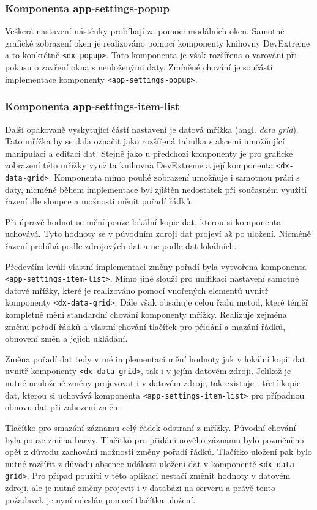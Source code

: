 \subsubsection*{Komponenta app-settings-popup}
Veškerá nastavení nástěnky probíhají za pomoci modálních oken. Samotné grafické zobrazení oken je realizováno pomocí komponenty knihovny DevExtreme a to konkrétně \texttt{<dx-popup>}. Tato komponenta je však rozšířena o varování při pokusu o zavření okna s neuloženými daty. Zmíněné chování je součástí implementace komponenty \texttt{<app-settings-popup>}.


\subsubsection*{Komponenta app-settings-item-list}
Další opakovaně vyskytující částí nastavení je datová mřížka (angl. \emph{data grid}). Tato mřížka by se dala označit jako rozšířená tabulka s akcemi umožňující manipulaci a editaci dat. Stejně jako u předchozí komponenty je pro grafické zobrazení této mřížky využita knihovna DevExtreme a její komponenta \texttt{<dx-data-grid>}. Komponenta mimo pouhé zobrazení umožňuje i samotnou práci s daty, nicméně během implementace byl zjištěn nedostatek při současném využití řazení dle sloupce a možnosti měnit pořadí řádků.

Při úpravě hodnot se mění pouze lokální kopie dat, kterou si komponenta uchovává. Tyto hodnoty se v původním zdroji dat projeví až po uložení. Nicméně řazení probíhá podle zdrojových dat a ne podle dat lokálních.

Především kvůli vlastní implementaci změny pořadí byla vytvořena komponenta \texttt{<app-settings-item-list>}. Mimo jiné slouží pro unifikaci nastavení samotné datové mřížky, které je realizováno pomocí vnořených elementů uvnitř komponenty \texttt{<dx-data-grid>}. Dále však obsahuje celou řadu metod, které téměř kompletně mění standardní chování komponenty mřížky. Realizuje zejména změnu pořadí řádků a vlastní chování tlačítek pro přidání a mazání řádků, obnovení změn a jejich ukládání.

Změna pořadí dat tedy v mé implementaci mění hodnoty jak v lokální kopii dat uvnitř komponenty \texttt{<dx-data-grid>}, tak i v jejím datovém zdroji. Jelikož je nutné neuložené změny projevovat i v datovém zdroji, tak existuje i třetí kopie dat, kterou si uchovává komponenta \texttt{<app-settings-item-list>} pro případnou obnovu dat při zahození změn.

Tlačítko pro smazání záznamu celý řádek odstraní z mřížky. Původní chování byla pouze změna barvy. Tlačítko pro přidání nového záznamu bylo pozměněno opět z důvodu zachování možnosti změny pořadí řádků. Tlačítko uložení pak bylo nutné rozšířit z důvodu absence události uložení dat v komponentě \texttt{<dx-data-grid>}. Pro případ použití v této aplikaci nestačí změnit hodnoty v datovém zdroji, ale je nutné změny projevit i v databázi na serveru a právě tento požadavek je nyní odeslán pomocí tlačítka uložení. 


